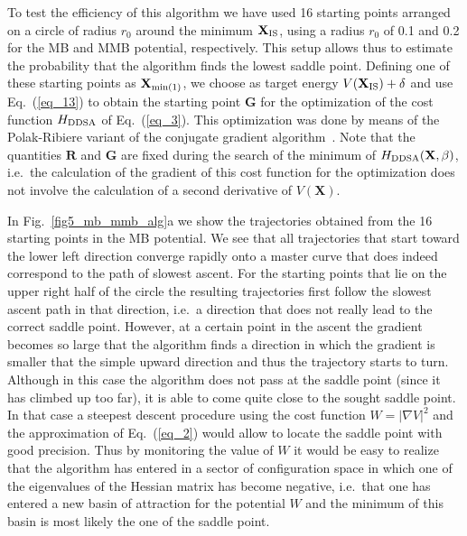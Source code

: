 \documentclass[aip,pre,twocolumn,reprint]{revtex4-1}
\begin{document}
To test the efficiency of this algorithm we have used 16 starting points
arranged on a circle of radius $r_0$ around the minimum $\mathbf{X}_{\rm
IS}$, using a radius $r_0$ of 0.1 and 0.2 for the MB and MMB potential,
respectively. This setup allows thus to estimate the probability
that the algorithm finds the lowest saddle point. Defining one of these
starting points as $\mathbf{X}_{{\rm min}(1)}$, we choose as target energy
$V(\mathbf{X}_{\rm IS})+ \delta$ and use Eq.~(\ref{eq_13}) to obtain
the starting point $\mathbf{G}$ for the optimization of the cost
function $H_{\rm DDSA}$ of Eq.~(\ref{eq_3}). This optimization was
done by means of the Polak-Ribiere variant of the conjugate gradient
algorithm~\cite{press1992numerical}. Note that the quantities $\mathbf{R}$
and $\mathbf{G}$ are fixed during the search of the minimum of $H_{\rm
DDSA}(\mathbf{X},\beta)$, i.e.~the calculation of the gradient of this
cost function for the optimization does not involve the calculation of
a second derivative of $V(\mathbf{X})$.

In Fig.~\ref{fig5_mb_mmb_alg}a we show the trajectories obtained from the
16 starting points in the MB potential. We see that all trajectories
that start toward the lower left direction converge rapidly onto
a master curve that does indeed correspond to the path of slowest
ascent. For the starting points that lie on the upper right half of
the circle the resulting trajectories first follow the slowest ascent
path in that direction, i.e.~a direction that does not really lead to
the correct saddle point. However, at a certain point in the ascent
the gradient becomes so large that the algorithm finds a direction
in which the gradient is smaller that the simple upward direction and
thus the trajectory starts to turn. Although in this case the algorithm
does not pass at the saddle point (since it has climbed up too far),
it is able to come quite close to the sought saddle point. In that case 
a steepest descent procedure using the cost function $W=|\nabla V |^2$
and the approximation of Eq.~(\ref{eq_2}) would allow to locate the
saddle point with good precision. Thus by monitoring the value of $W$
it would be easy to realize that the algorithm has entered in a sector
of configuration space in which one of the eigenvalues of the Hessian
matrix has become negative, i.e.~that one has entered a new basin of
attraction for the potential $W$ and the minimum of this basin is most
likely the one of the saddle point.
\end{document}
